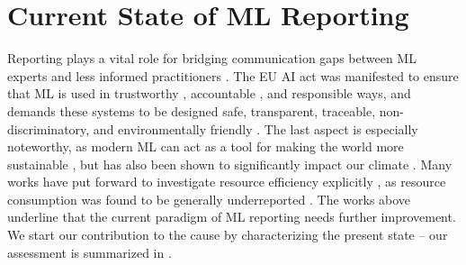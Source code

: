 \documentclass[sn-mathphys,Numbered]{sn-jnl}%
\theoremstyle{thmstylethree}%
\begin{document}
\section{Current State of ML Reporting}
\label{sec:rw}

Reporting plays a vital role for bridging communication gaps between ML experts and less informed practitioners \cite{piorkowski_how_2021}.
The EU AI act \cite{eu_ai_hleg_assessment_2020} was manifested to ensure that ML is used in trustworthy \cite{chatila_trustworthy_2021,avin_filling_2021}, accountable \cite{hauer_overview_2023}, and responsible \cite{baum2022responsibility,Dignum/2019a} ways, and demands these systems to be designed safe, transparent, traceable, non-discriminatory, and environmentally friendly \cite{parliament_step_2023}.
The last aspect is especially noteworthy, as modern ML can act as a tool for making the world more sustainable \cite{van_wynsberghe_sustainable_2021,kar_how_2022}, but has also been shown to significantly impact our climate \cite{strubell_energy_2020,bender_dangers_2021,patterson_carbon_2021}.
Many works have put forward to investigate resource efficiency explicitly \cite{Assessing_Energy_Efficiency_of_ML,lacoste_quantifying_2019}, as resource consumption was found to be generally underreported \cite{Schwartz/etal/2020b,castano_exploring_2023}.
The works above underline that the current paradigm of ML reporting needs further improvement.
We start our contribution to the cause by characterizing the present state -- our assessment is summarized in .
\end{document}
